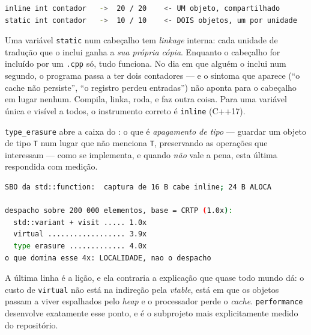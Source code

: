 \begin{lstlisting}[style=bt, language=bash,
    caption={Saída de \texttt{src/linkage/}: duas unidades de tradução
             incrementam a mesma variável dez vezes cada uma.}]
inline int contador   ->  20 / 20    <- UM objeto, compartilhado
static int contador   ->  10 / 10    <- DOIS objetos, um por unidade
\end{lstlisting}

\begin{armadilha}
Uma variável \texttt{static} num cabeçalho tem \emph{linkage} interna: cada
unidade de tradução que o inclui ganha a \emph{sua própria cópia}. Enquanto o
cabeçalho for incluído por um \texttt{.cpp} só, tudo funciona. No dia em que
alguém o inclui num segundo, o programa passa a ter dois contadores --- e o
sintoma que aparece (``o cache não persiste'', ``o registro perdeu entradas'')
não aponta para o cabeçalho em lugar nenhum. Compila, linka, roda, e faz outra
coisa. Para uma variável única e visível a todos, o instrumento correto é
\texttt{inline} (C++17).
\end{armadilha}

\texttt{type\_erasure} abre a caixa do : o que é
\emph{apagamento de tipo} --- guardar um objeto de tipo \texttt{T} num lugar que
não menciona \texttt{T}, preservando as operações que interessam --- como se
implementa, e quando \emph{não} vale a pena, esta última respondida com medição.

\begin{lstlisting}[style=bt, language=bash,
    caption={Saída de \texttt{src/type\_erasure/}: o buffer interno da
             \texttt{std::function} e o custo relativo de quatro formas de
             despacho.}]
SBO da std::function:  captura de 16 B cabe inline; 24 B ALOCA

despacho sobre 200 000 elementos, base = CRTP (1.0x):
  std::variant + visit ..... 1.0x
  virtual .................. 3.9x
  type erasure ............. 4.0x
o que domina esse 4x: LOCALIDADE, nao o despacho
\end{lstlisting}

A última linha é a lição, e ela contraria a explicação que quase todo mundo dá:
o custo de \texttt{virtual} não está na indireção pela \emph{vtable}, está em
que os objetos passam a viver espalhados pelo \emph{heap} e o processador perde
o \emph{cache}. \texttt{performance} desenvolve exatamente esse ponto, e é o
subprojeto mais explicitamente medido do repositório.

